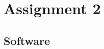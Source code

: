 \section{Assignment 2}
\clearpage
\subsection{Software}
\inputminted{cpp}{../leds-uart/main/leds-uart.cpp}

